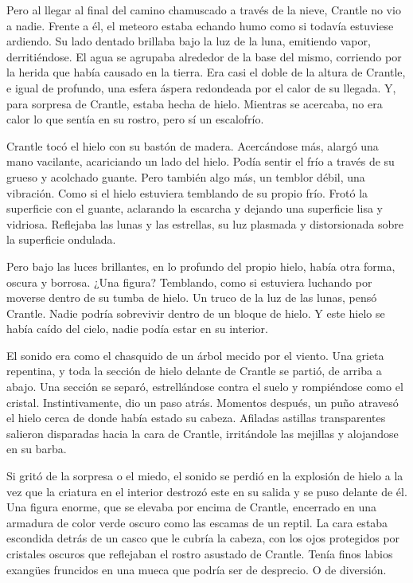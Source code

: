 Pero al llegar al final del camino chamuscado a través de la nieve, Crantle no vio a nadie. Frente a él, el meteoro estaba echando humo como si todavía estuviese ardiendo. Su lado dentado brillaba bajo la luz de la luna, emitiendo vapor, derritiéndose. El agua se agrupaba alrededor de la base del mismo, corriendo por la herida que había causado en la tierra. Era casi el doble de la altura de Crantle, e igual de profundo, una esfera áspera redondeada por el calor de su llegada. Y, para sorpresa de Crantle, estaba hecha de hielo. Mientras se acercaba, no era calor lo que sentía en su rostro, pero sí un escalofrío.



Crantle tocó el hielo con su bastón de madera. Acercándose más, alargó una mano vacilante, acariciando un lado del hielo. Podía sentir el frío a través de su grueso y acolchado guante. Pero también algo más, un temblor débil, una vibración. Como si el hielo estuviera temblando de su propio frío. Frotó la superficie con el guante, aclarando la escarcha y dejando una superficie lisa y vidriosa. Reflejaba las lunas y las estrellas, su luz plasmada y distorsionada sobre la superficie ondulada.



Pero bajo las luces brillantes, en lo profundo del propio hielo, había otra forma, oscura y borrosa. ¿Una figura? Temblando, como si estuviera luchando por moverse dentro de su tumba de hielo. Un truco de la luz de las lunas, pensó Crantle. Nadie podría sobrevivir dentro de un bloque de hielo. Y este hielo se había caído del cielo, nadie podía estar en su interior.



El sonido era como el chasquido de un árbol mecido por el viento. Una grieta repentina, y toda la sección de hielo delante de Crantle se partió, de arriba a abajo. Una sección se separó, estrellándose contra el suelo y rompiéndose como el cristal. Instintivamente, dio un paso atrás. Momentos después, un puño atravesó el hielo cerca de donde había estado su cabeza. Afiladas astillas transparentes salieron disparadas hacia la cara de Crantle, irritándole las mejillas y alojandose en su barba.



Si gritó de la sorpresa o el miedo, el sonido se perdió en la explosión de hielo a la vez que la criatura en el interior destrozó este en su salida y se puso delante de él. Una figura enorme, que se elevaba por encima de Crantle, encerrado en una armadura de color verde oscuro como las escamas de un reptil. La cara estaba escondida detrás de un casco que le cubría la cabeza, con los ojos protegidos por cristales oscuros que reflejaban el rostro asustado de Crantle. Tenía finos labios exangües fruncidos en una mueca que podría ser de desprecio. O de diversión.



